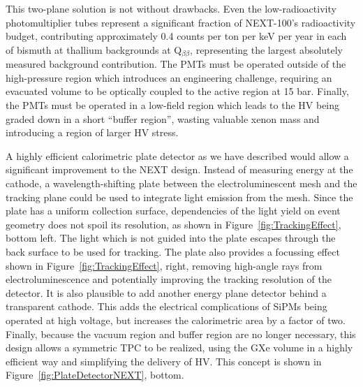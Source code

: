 This two-plane solution is not without drawbacks. Even the low-radioactivity photomultiplier tubes represent a significant fraction of NEXT-100's radioactivity budget, contributing approximately 0.4 counts per ton per keV per year in each of bismuth at thallium backgrounds at Q$_{\beta\beta}$, representing the largest absolutely measured background contribution.  The PMTs must be operated outside of the high-pressure region which introduces an engineering challenge, requiring an evacuated volume to be optically coupled to the active region at 15 bar. Finally, the PMTs must be operated in a low-field region which leads to the HV being graded down in a short ``buffer region'', wasting valuable xenon mass and introducing a region of larger HV stress.

A highly efficient calorimetric plate detector as we have described would allow a significant improvement to the NEXT design.  Instead of measuring energy at the cathode, a wavelength-shifting plate between the electroluminescent mesh and the tracking plane could be used to integrate light emission from the mesh. Since the plate has a uniform collection surface,  dependencies of the light yield on event geometry does not spoil its resolution, as shown in Figure~\ref{fig:TrackingEffect}, bottom left.  The light which is not guided into the plate escapes through the back surface to be used for tracking.  The plate also provides a focussing effect shown in Figure~\ref{fig:TrackingEffect}, right, removing high-angle rays from electroluminescence and potentially improving the tracking resolution of the detector.  It is also plausible to add another energy plane detector behind a transparent cathode. This adds the electrical complications of  SiPMs being operated at high voltage, but increases the calorimetric area by a factor of two.  Finally, because the vacuum region and buffer region are no longer necessary, this design allows a symmetric TPC to be realized, using the GXe volume in a highly efficient way and simplifying the delivery of HV.  This concept is shown in Figure~\ref{fig:PlateDetectorNEXT}, bottom.





